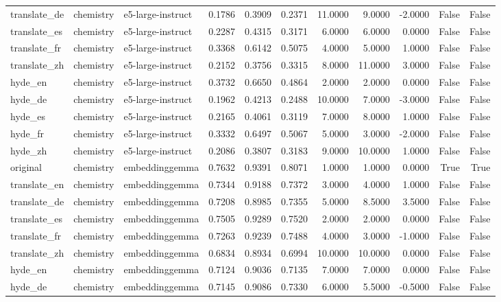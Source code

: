 \begin{tabular}{lllrrrrrrrr}
translate\_de & chemistry & e5-large-instruct & 0.1786 & 0.3909 & 0.2371 & 11.0000 & 9.0000 & -2.0000 & False & False \\
translate\_es & chemistry & e5-large-instruct & 0.2287 & 0.4315 & 0.3171 & 6.0000 & 6.0000 & 0.0000 & False & False \\
translate\_fr & chemistry & e5-large-instruct & 0.3368 & 0.6142 & 0.5075 & 4.0000 & 5.0000 & 1.0000 & False & False \\
translate\_zh & chemistry & e5-large-instruct & 0.2152 & 0.3756 & 0.3315 & 8.0000 & 11.0000 & 3.0000 & False & False \\
hyde\_en & chemistry & e5-large-instruct & 0.3732 & 0.6650 & 0.4864 & 2.0000 & 2.0000 & 0.0000 & False & False \\
hyde\_de & chemistry & e5-large-instruct & 0.1962 & 0.4213 & 0.2488 & 10.0000 & 7.0000 & -3.0000 & False & False \\
hyde\_es & chemistry & e5-large-instruct & 0.2165 & 0.4061 & 0.3119 & 7.0000 & 8.0000 & 1.0000 & False & False \\
hyde\_fr & chemistry & e5-large-instruct & 0.3332 & 0.6497 & 0.5067 & 5.0000 & 3.0000 & -2.0000 & False & False \\
hyde\_zh & chemistry & e5-large-instruct & 0.2086 & 0.3807 & 0.3183 & 9.0000 & 10.0000 & 1.0000 & False & False \\
original & chemistry & embeddinggemma & 0.7632 & 0.9391 & 0.8071 & 1.0000 & 1.0000 & 0.0000 & True & True \\
translate\_en & chemistry & embeddinggemma & 0.7344 & 0.9188 & 0.7372 & 3.0000 & 4.0000 & 1.0000 & False & False \\
translate\_de & chemistry & embeddinggemma & 0.7208 & 0.8985 & 0.7355 & 5.0000 & 8.5000 & 3.5000 & False & False \\
translate\_es & chemistry & embeddinggemma & 0.7505 & 0.9289 & 0.7520 & 2.0000 & 2.0000 & 0.0000 & False & False \\
translate\_fr & chemistry & embeddinggemma & 0.7263 & 0.9239 & 0.7488 & 4.0000 & 3.0000 & -1.0000 & False & False \\
translate\_zh & chemistry & embeddinggemma & 0.6834 & 0.8934 & 0.6994 & 10.0000 & 10.0000 & 0.0000 & False & False \\
hyde\_en & chemistry & embeddinggemma & 0.7124 & 0.9036 & 0.7135 & 7.0000 & 7.0000 & 0.0000 & False & False \\
hyde\_de & chemistry & embeddinggemma & 0.7145 & 0.9086 & 0.7330 & 6.0000 & 5.5000 & -0.5000 & False & False \\

\end{tabular}
